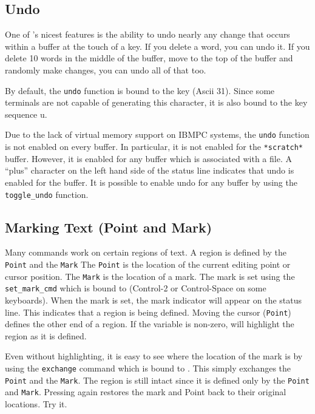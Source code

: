 \subsection{Undo}

   One of \jed{}'s nicest features is the ability to undo nearly any change
   that occurs within a buffer at the touch of a key.  If you delete a word,
   you can undo it.  If you delete 10 words in the middle of the buffer,
   move to the top of the buffer and randomly make changes, you can undo all
   of that too.

   By default, the \verb|undo| function is bound to the key 
   (Ascii 31). Since some terminals are not capable of generating this
   character, it is also bound to the key sequence  u.

   Due to the lack of virtual memory support on IBMPC systems, the
   \verb|undo| function is not enabled on every buffer.  In particular, it
   is not enabled for the \verb|*scratch*| buffer.  However, it is enabled
   for any buffer which is associated with a file.  A ``plus'' character on
   the left hand side of the status line indicates that undo is enabled for
   the buffer. It is possible to enable undo for any buffer by using the
   \verb|toggle_undo| function.

\subsection{Marking Text (Point and Mark)}

   Many commands work on certain regions of text.  A region is defined by
   the \verb|Point| and the \verb|Mark| The \verb|Point| is the location of
   the current editing point or cursor position.  The \verb|Mark| is the
   location of a mark. The mark is set using the \verb|set_mark_cmd| which
   is bound to  (Control-2 or Control-Space on some keyboards).
   When the mark is set, the  mark indicator will appear on the
   status line.  This indicates that a region is being defined.  Moving the
   cursor (\verb|Point|) defines the other end of a region.  If the variable
    is non-zero, \jed{} will highlight the region as it is
   defined.

Even without highlighting, it is easy to see where the location of the mark
is by using the \verb|exchange| command which is bound to  .
This simply exchanges the \verb|Point| and the \verb|Mark|.  The region is
still intact since it is defined only by the \verb|Point| and \verb|Mark|.
Pressing   again restores the mark and Point back to their
original locations.  Try it.

